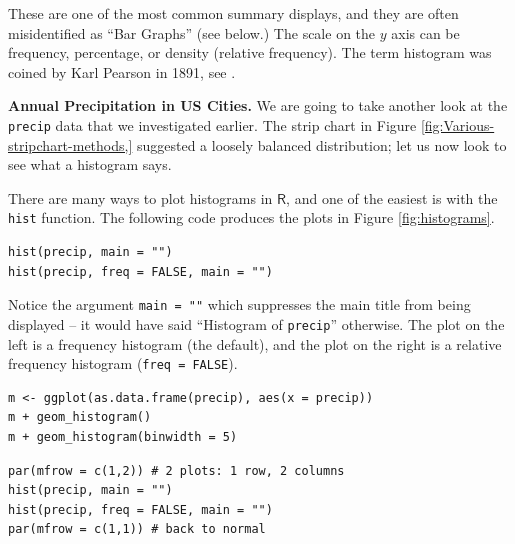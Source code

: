 \documentclass[captions=tableheading]{scrbook}
\begin{document}
These are one of the most common summary displays, and they are often misidentified as ``Bar Graphs'' (see below.) The scale on the \(y\) axis can be frequency, percentage, or density (relative frequency). The term histogram was coined by Karl Pearson in 1891, see \cite{Miller}.

\begin{example}
\textbf{Annual Precipitation in US Cities.} We are going to take another look at the \texttt{precip} data that we investigated earlier. The strip chart in Figure \ref{fig:Various-stripchart-methods,} suggested a loosely balanced distribution; let us now look to see what a histogram says. 

There are many ways to plot histograms in \(\mathsf{R}\), and one of the easiest is with the \texttt{hist} function. The following code produces the plots in Figure \ref{fig:histograms}.


\begin{verbatim}
hist(precip, main = "")
hist(precip, freq = FALSE, main = "")
\end{verbatim}

Notice the argument \texttt{main = ""} which suppresses the main title from being displayed -- it would have said ``Histogram of \texttt{precip}'' otherwise. The plot on the left is a frequency histogram (the default), and the plot on the right is a relative frequency histogram (\texttt{freq = FALSE}). 


\begin{verbatim}
m <- ggplot(as.data.frame(precip), aes(x = precip))
m + geom_histogram()
m + geom_histogram(binwidth = 5)
\end{verbatim}








\begin{verbatim}
par(mfrow = c(1,2)) # 2 plots: 1 row, 2 columns
hist(precip, main = "")
hist(precip, freq = FALSE, main = "")
par(mfrow = c(1,1)) # back to normal
\end{verbatim}


\end{example}
\end{document}
